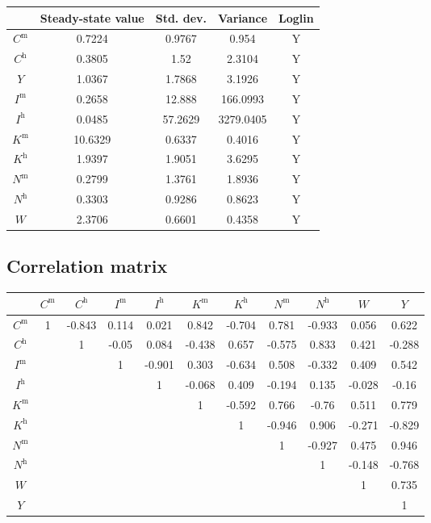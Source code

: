\begin{tabular}{c|c|c|c|c|}
  & Steady-state value & Std. dev. & Variance & Loglin\\
\hline
$C^{\mathrm{m}}$ & 0.7224 & 0.9767 & 0.954 & Y    \\
$C^{\mathrm{h}}$ & 0.3805 & 1.52 & 2.3104 & Y    \\
$Y$ & 1.0367 & 1.7868 & 3.1926 & Y    \\
$I^{\mathrm{m}}$ & 0.2658 & 12.888 & 166.0993 & Y    \\
$I^{\mathrm{h}}$ & 0.0485 & 57.2629 & 3279.0405 & Y    \\
$K^{\mathrm{m}}$ & 10.6329 & 0.6337 & 0.4016 & Y    \\
$K^{\mathrm{h}}$ & 1.9397 & 1.9051 & 3.6295 & Y    \\
$N^{\mathrm{m}}$ & 0.2799 & 1.3761 & 1.8936 & Y    \\
$N^{\mathrm{h}}$ & 0.3303 & 0.9286 & 0.8623 & Y    \\
$W$ & 2.3706 & 0.6601 & 0.4358 & Y    \\
\hline
\end{tabular}


\subsection{Correlation matrix}

\begin{tabular}{c|cccccccccc|}
  & $C^{\mathrm{m}}$ & $C^{\mathrm{h}}$ & $I^{\mathrm{m}}$ & $I^{\mathrm{h}}$ & $K^{\mathrm{m}}$ & $K^{\mathrm{h}}$ & $N^{\mathrm{m}}$ & $N^{\mathrm{h}}$ & $W$ & $Y$\\
\hline
$C^{\mathrm{m}}$ & 1 & -0.843 & 0.114 & 0.021 & 0.842 & -0.704 & 0.781 & -0.933 & 0.056 & 0.622 \\
$C^{\mathrm{h}}$ &  & 1 & -0.05 & 0.084 & -0.438 & 0.657 & -0.575 & 0.833 & 0.421 & -0.288 \\
$I^{\mathrm{m}}$ &  &  & 1 & -0.901 & 0.303 & -0.634 & 0.508 & -0.332 & 0.409 & 0.542 \\
$I^{\mathrm{h}}$ &  &  &  & 1 & -0.068 & 0.409 & -0.194 & 0.135 & -0.028 & -0.16 \\
$K^{\mathrm{m}}$ &  &  &  &  & 1 & -0.592 & 0.766 & -0.76 & 0.511 & 0.779 \\
$K^{\mathrm{h}}$ &  &  &  &  &  & 1 & -0.946 & 0.906 & -0.271 & -0.829 \\
$N^{\mathrm{m}}$ &  &  &  &  &  &  & 1 & -0.927 & 0.475 & 0.946 \\
$N^{\mathrm{h}}$ &  &  &  &  &  &  &  & 1 & -0.148 & -0.768 \\
$W$ &  &  &  &  &  &  &  &  & 1 & 0.735 \\
$Y$ &  &  &  &  &  &  &  &  &  & 1 \\
\hline
\end{tabular}


